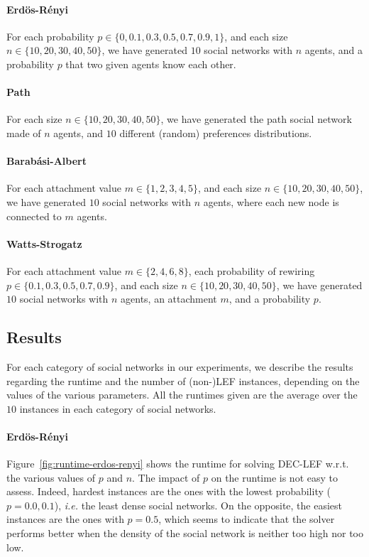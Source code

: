 \documentclass{article}
\begin{document}
\paragraph{Erd\"os-R\'enyi} For each probability $p \in \{0, 0.1, 0.3, 0.5, 0.7, 0.9, 1\}$, and each size $n \in \{10,20,30,40,50\}$, we have generated $10$ social networks with $n$ agents, and a probability $p$ that two given agents know each other.

\paragraph{Path} For each size $n \in \{10,20,30,40,50\}$, we have generated the path social network made of $n$ agents, and $10$ different (random) preferences distributions.

\paragraph{Barab\'asi-Albert} For each attachment value $m \in \{1,2,3,4,5\}$, and each size $n \in \{10,20,30,40,50\}$, we have generated $10$ social networks with $n$ agents, where each new node is connected to $m$ agents.

\paragraph{Watts-Strogatz} For each attachment value $m \in \{2,4,6,8\}$, each probability of rewiring $p \in \{0.1, 0.3, 0.5, 0.7, 0.9\}$, and each size $n \in \{10,20,30,40,50\}$, we have generated $10$ social networks with $n$ agents, an attachment $m$, and a probability $p$.

\subsection{Results}
For each category of social networks in our experiments, we describe the results regarding the runtime and the number of (non-)LEF instances, depending on the values of the various parameters. All the runtimes given are the average over the $10$ instances in each category of social networks.

\paragraph{Erd\"os-R\'enyi} Figure~\ref{fig:runtime-erdos-renyi} shows the runtime for solving DEC-LEF w.r.t. the various values of  $p$ and $n$. The impact of $p$ on the runtime is not easy to assess. Indeed, hardest instances are the ones with the lowest probability ($p = 0.0, 0.1$), {\em i.e.} the least dense social networks. On the opposite, the easiest instances are the ones with $p=0.5$, which seems to indicate that the solver performs better when the density of the social network is neither too high nor too low. 
\end{document}
